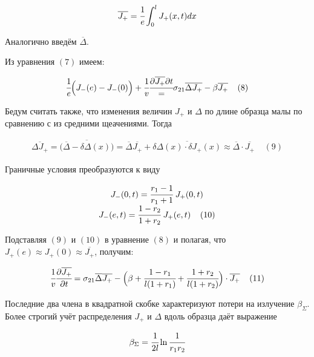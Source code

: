 \documentclass[a4paper,14pt,russian]{article}
\begin{document}
\begin{eqnarray}
\overline{J_+} = \cfrac {1} {e} \int_0^l J_+ (x, t) dx
\end{eqnarray}

Аналогично введём $\overline{\Delta}$.

Из уравнения $(7)$ имеем:

\begin{eqnarray}
\cfrac {1} {e} \Big( J_- (e) - J_- (0) \Big) + \cfrac {1} {v} \cfrac {\partial \overline{J_+} {\partial t}} = \sigma_{21} \overline{\Delta J_+} - \beta \overline{J_+} \;\;\;\; (8)
\end{eqnarray}

Бедум считать также, что изменения величин $J_+$ и $\Delta$ по длине образца малы по сравнению с из средними щеачениями. Тогда


\begin{eqnarray}
\overline{\Delta J_+} = \overline{\Big( \overline{\Delta} - \delta \Delta (x) \Big)} = \overline{\Delta} \overline{J_+} + \overline{\delta \Delta (x) \cdot \delta J_+(x)} \approx \overline{\Delta} \cdot \overline{J_+} \;\;\;\; (9)
\end{eqnarray}

Граничные условия преобразуются к виду

\begin{eqnarray}
\left . \begin{matrix}
J_-(0, t) = \cfrac {r_1 - 1} {r_1 + 1} \; J_+ (0, t) \\
J_-(e, t) = \cfrac {1 - r_2} {1 + r_2} \; J_+ (e, t) \;\;\;\; (10)
\end{matrix} \right.
\end{eqnarray}

Подставляя $(9)$ и $(10)$ в уравнение $(8)$ и полагая, что $J_+(e) \approx J_+(0) \approx \overline{J_+}$, получим:

\begin{eqnarray}
\cfrac {1} {v} \cfrac {\partial \overline{J_+}} {\partial t} = \sigma_{21} \overline{\Delta} \overline{J_+} - \Big( \beta + \cfrac {1 - r_1} {l (1 + r_1)} + \cfrac {1 + r_2} {l (1 + r_2)} \Big) \cdot \overline{J_+} \;\;\;\; (11)
\end{eqnarray}

Последние два члена в квадратной скобке характеризуют потери на излучение $\beta_{\Sigma}$. Более строгий учёт распределения $J_+$ и $\Delta$ вдоль образца даёт выражение


\begin{eqnarray}
\beta_{\Sigma} = \cfrac {1} {2l} \ln \cfrac {1} {r_1 r_2}
\end{eqnarray}
\end{document}
